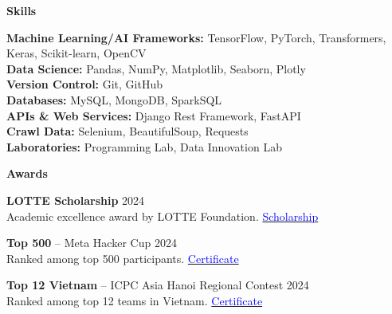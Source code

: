 \documentclass[10pt]{article}
\begin{document}
\begin{center}
    \vspace{0.05cm}
    \hrulefill
    \vspace{0.05cm}
\end{center}

\begin{center}
    \textbf{Skills}
\end{center}

\textbf{Machine Learning/AI Frameworks:} TensorFlow, PyTorch, Transformers, Keras, Scikit-learn, OpenCV \\
\textbf{Data Science:} Pandas, NumPy, Matplotlib, Seaborn, Plotly \\
\textbf{Version Control:} Git, GitHub \\
\textbf{Databases:} MySQL, MongoDB, SparkSQL \\
\textbf{APIs \& Web Services:} Django Rest Framework, FastAPI \\
\textbf{Crawl Data:} Selenium, BeautifulSoup, Requests \\
\textbf{Laboratories:} Programming Lab, Data Innovation Lab

\begin{center}
    \vspace{0.05cm}
    \hrulefill
    \vspace{0.05cm}
\end{center}

\begin{center}
    \textbf{Awards}
\end{center}

\textbf{LOTTE Scholarship} \hfill 2024 \\
Academic excellence award by LOTTE Foundation. \hfill \href{https://drive.google.com/file/d/1-VoS_M4o_Dtu5mwoOiM1BGahttdvneo4/view?usp=sharing}{\textcolor{blue}{Scholarship}}

\textbf{Top 500} -- Meta Hacker Cup \hfill 2024 \\
Ranked among top 500 participants. \hfill \href{https://www.facebook.com/codingcompetitions/hacker-cup/2024/certificate/484986933064775?source=facebook}{\textcolor{blue}{Certificate}}

\textbf{Top 12 Vietnam} -- ICPC Asia Hanoi Regional Contest \hfill 2024 \\
Ranked among top 12 teams in Vietnam. \hfill \href{https://github.com/taitruong256/Competitive-programming/blob/main/DH-Cong-nghiep-Thanh-pho-Ho-Chi-Minh-certificates-Top12-Viet-Nam.pdf}{\textcolor{blue}{Certificate}}
\end{document}
